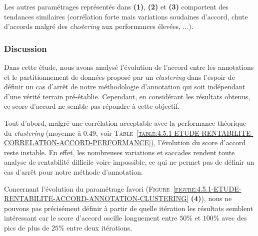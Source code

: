 			Les autres paramétrages représentés dans \textbf{(1)}, \textbf{(2)} et \textbf{(3)} comportent des tendances similaires (corrélation forte mais variations soudaines d'accord, chute d'accords malgré des \textit{clustering} aux performances élevées, ...).

		\subsubsection{Discussion}
		
			Dans cette étude, nous avons analysé l'évolution de l'accord entre les annotations et le partitionnement de données proposé par un \textit{clustering} dans l'espoir de définir un cas d'arrêt de notre méthodologie d'annotation qui soit indépendant d'une vérité terrain pré-établie.
			Cependant, en considérant les résultats obtenus, ce score d'accord ne semble pas répondre à cette objectif.
			
			Tout d'abord, malgré une corrélation acceptable avec la performance théorique du \textit{clustering} (moyenne à $0.49$, voir \textsc{Table~\ref{table:4.5.1-ETUDE-RENTABILITE-CORRELATION-ACCORD-PERFORMANCE}}), l'évolution du score d'accord reste instable.
			En effet, les nombreuses variations et saccades rendent toute analyse de rentabilité difficile voire impossible, ce qui ne permet pas de définir un cas d'arrêt pour notre méthode d'annotation.
			
			\begin{leftBarExamples}
				Concernant l'évolution du paramétrage favori (\textsc{Figure~\ref{figure:4.5.1-ETUDE-RENTABILITE-ACCORD-ANNOTATION-CLUSTERING}} \textbf{(4)}), nous ne pouvons pas précisément définir à partir de quelle itération les résultats semblent intéressant car le score d'accord oscille longuement entre $50$\% et $100$\% avec des pics de plus de $25$\% entre deux itérations. 
			\end{leftBarExamples}
			
